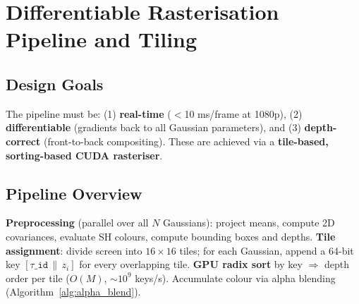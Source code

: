 \section{Differentiable Rasterisation Pipeline and Tiling}
\label{sec:rasterization}

\subsection{Design Goals}

The pipeline must be: (1) \textbf{real-time} ($<$10 ms/frame at 1080p),
(2) \textbf{differentiable} (gradients back to all Gaussian parameters), and
(3) \textbf{depth-correct} (front-to-back compositing). These are achieved
via a \textbf{tile-based, sorting-based CUDA rasteriser}.

\subsection{Pipeline Overview}

\begin{algorithm}[H]
  \caption{3DGS Differentiable Rasterisation Pipeline}
  \label{alg:pipeline}
  \begin{algorithmic}[1]
    \State \textbf{Preprocessing} (parallel over all $N$ Gaussians):
      project means, compute 2D covariances, evaluate SH colours, compute
      bounding boxes and depths.
    \State \textbf{Tile assignment}: divide screen into $16\times16$ tiles;
      for each Gaussian, append a 64-bit key
      $[\tau\texttt{\_id}\,\|\,z_i]$ for every overlapping tile.
    \State \textbf{GPU radix sort} by key $\Rightarrow$ depth order per tile
      ($O(M)$, $\sim10^9$ keys/s).
        \State Accumulate colour via alpha blending
               (Algorithm~\ref{alg:alpha_blend}).
      \EndFor
    \EndFor
    \State {}
  \end{algorithmic}
\end{algorithm}

